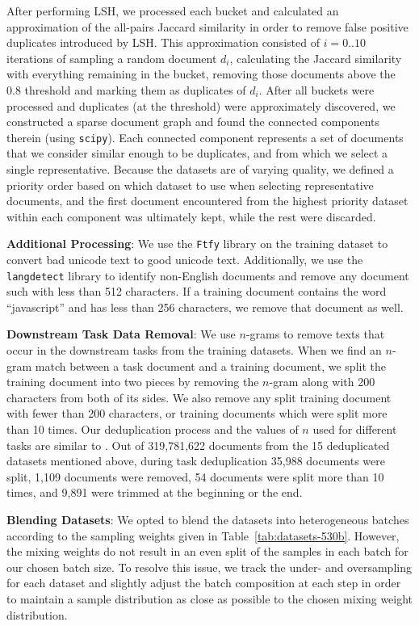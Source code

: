 \documentclass[11pt]{article}
\begin{document}
After performing LSH, we processed each bucket and calculated an approximation of the all-pairs Jaccard similarity in order to remove false positive duplicates introduced by LSH. This approximation consisted of $i=0..10$ iterations of sampling a random document $d_i$, calculating the Jaccard similarity with everything remaining in the bucket, removing those documents above the 0.8 threshold and marking them as duplicates of $d_i$. After all buckets were processed and duplicates (at the threshold) were approximately discovered, we constructed a sparse document graph and found the connected components therein (using \texttt{scipy}). Each connected component represents a set of documents that we consider similar enough to be duplicates, and from which we select a single representative. Because the datasets are of varying quality, we defined a priority order based on which dataset to use when selecting representative documents, and the first document encountered from the highest priority dataset within each component was ultimately kept, while the rest were discarded.

\textbf{Additional Processing}: We use the \texttt{Ftfy} library \cite{speer-2019-ftfy} on the training dataset to convert bad unicode text to good unicode text. Additionally, we use the \texttt{langdetect} \cite{danilk-2021-langdetect} library to identify non-English documents and remove any document such with less than 512 characters. If a training document contains the word ``javascript'' and has less than 256 characters, we remove that document as well. 

\textbf{Downstream Task Data Removal}: We use $n$-grams to remove texts that occur in the downstream tasks from the training datasets. When we find an $n$-gram match between a task document and a training document, we split the training document into two pieces by removing the $n$-gram along with 200 characters from both of its sides. We also remove any split training document with fewer than 200 characters, or training documents which were split more than 10 times. Our deduplication process and the values of $n$ used for different tasks are similar to \cite{brown2020language}. Out of 319,781,622 documents from the 15 deduplicated datasets mentioned above, during task deduplication 35,988 documents were split, 1,109 documents were removed, 54 documents were split more than 10 times, and 9,891 were trimmed at the beginning or the end.

\textbf{Blending Datasets}: We opted to blend the datasets into heterogeneous batches according to the sampling weights given in Table~\ref{tab:datasets-530b}. However, the mixing weights do not result in an even split of the samples in each batch for our chosen batch size. To resolve this issue, we track the under- and oversampling for each dataset and slightly adjust the batch composition at each step in order to maintain a sample distribution as close as possible to the chosen mixing weight distribution. 
\end{document}
